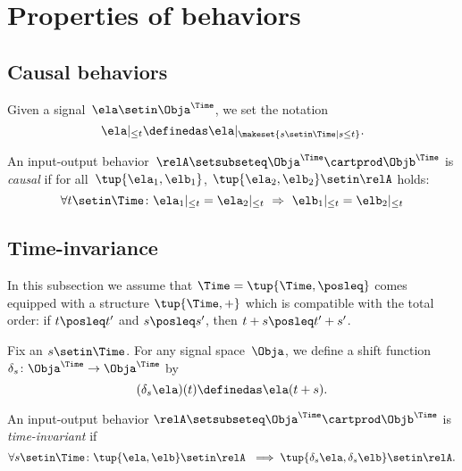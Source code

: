 
\section{Properties of behaviors}

\subsection{Causal behaviors}

Given a signal~$\ela \setin \Obja^\Time$, we set the notation
\begin{equation}
    \ela \vert_{\leq t} \definedas  \ela \vert_{\makeset{ s \setin \Time \mid s \leq t}}.
\end{equation}

\begin{definition}\label{def:causal-io}
    An input-output behavior~$\relA \setsubseteq \Obja^\Time \cartprod \Objb^\Time$ is \emph{causal} if for all~$\tup{\ela_1, \elb_1}$, $\tup{\ela_2, \elb_2} \setin \relA$ holds:
    \begin{equation}
        \forall t \setin \Time\colon \ela_1 \vert_{ \leq t} = \ela_2 \vert_{ \leq t} \  \Rightarrow \ \elb_1 \vert_{ \leq t} = \elb_2 \vert_{ \leq t}
    \end{equation}
\end{definition}


\subsection{Time-invariance}

In this subsection we assume that $\Time = \tup{\Time, \posleq}$ comes equipped with a  structure $\tup{\Time, +}$ which is compatible with the total order: if $t \posleq t'$ and $s \posleq s'$, then $t + s \posleq t' + s'$.

Fix an $s \setin \Time$.
For any signal space~$\Obja$, we define a shift function~$\delta_s\colon \Obja^\Time \to \Obja^\Time$ by
\begin{equation}
    (\delta_s \ela)(t)
    \definedas \ela(t + s).
\end{equation}

\begin{definition}\label{def:behavior-time-invariant}
    An input-output behavior $\relA \setsubseteq \Obja^\Time \cartprod \Objb^\Time$ is \emph{time-invariant} if
    \begin{equation}
        \forall s \setin \Time\colon \tup{\ela, \elb} \setin \relA  \ \implies \tup{\delta_s \ela, \delta_s \elb} \setin \relA.
    \end{equation}
\end{definition}


